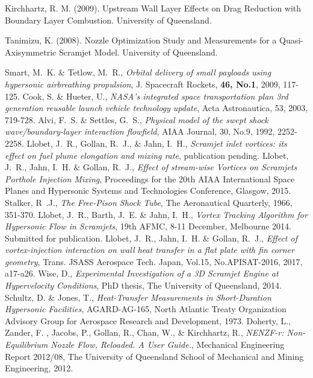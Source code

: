 \documentclass{AIAA}
\begin{document}
\begin{thebibliography}{}
Kirchhartz, R. M. (2009). Upstream Wall Layer Effects on Drag Reduction with Boundary Layer Combustion. University of Queensland.


Tanimizu, K. (2008). Nozzle Optimization Study and Measurements for a Quasi-Axisymmetric Scramjet Model. University of Queensland.


Smart, M.~K. \& Tetlow, M.~R., {\it Orbital delivery of small payloads using hypersonic airbreathing propulsion}, J. Spacecraft Rockets, {\bf 46, No.1}, 2009, 117-125.
Cook, S. \& Hueter, U., {\it NASA's integrated space transportation plan 3rd generation reusable launch vehicle technology update}, Acta Astronautica, 53, 2003, 719-728.
Alvi, F.~S. \& Settles, G.~S., {\it Physical model of the swept shock wave/boundary-layer interaction flowfield}, AIAA Journal, 30, No.9, 1992, 2252-2258.
Llobet, J.~R., Gollan, R.~J., \& Jahn, I.~H., {\it Scramjet inlet vortices: its effect on fuel plume elongation and mixing rate}, publication pending.
Llobet, J.~R., Jahn, I.~H. \& Gollan, R.~J., {\it Effect of stream-wise Vortices on Scramjets Porthole Injection Mixing}, Proceedings for the 20th AIAA International Space Planes and Hypersonic Systems and Technologies Conference, Glasgow, 2015. 
Stalker, R~.J., {\it The Free-Pison Shock Tube}, The Aeronautical Quarterly, 1966, 351-370.
Llobet, J.~R., Barth, J.~E. \& Jahn, I.~H., {\it Vortex Tracking Algorithm for Hypersonic Flow in Scramjets}, 19th AFMC, 8-11 December, Melbourne 2014. Submitted for publication.
Llobet, J.~R., Jahn, I.~H. \& Gollan, R.~J., {\it Effect of vortex-injection interaction on wall heat transfer in a flat plate with fin corner geometry}, Trans. JSASS Aerospace Tech. Japan, Vol.15, No.APISAT-2016, 2017, a17-a26. 
Wise, D., {\it Experimental Investigation of a 3D Scramjet Engine at Hypervelocity Conditions}, PhD thesis, The University of Queensland, 2014.
Schultz, D. \& Jones, T., {\it Heat-Transfer Measurements in Short-Duration Hypersonic Facilities}, AGARD-AG-165, North Atlantic Treaty Organization Advisory Group for Aerospace Research and Development, 1973.
Doherty, L., Zander, F. , Jacobs, P., Gollan, R., Chan, W., \& Kirchhartz, R., {\it NENZF-r: Non-Equilibrium Nozzle Flow, Reloaded. A User Guide.}, Mechanical Engineering Report 2012/08, The University of Queensland School of Mechanical and Mining Engineering, 2012.

\end{thebibliography}
\end{document}
